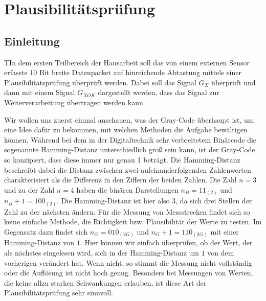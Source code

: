 \documentclass{report}
\begin{document}
\newpage


\tableofcontents

\listoffigures

\newpage
\renewcommand{\thechapter}{A}

\chapter{Plausibilitätsprüfung}
\label{cha:teil-plausibilitat}

\section{Einleitung}
\label{sec:einleitung}

\begin{task}
  TIn dem ersten Teilbereich der Hausarbeit soll das von einem externen Sensor erfasste 10 Bit breite Datenpacket auf hinreichende Abtastung mittels einer Plausibilitätsprüfung überprüft werden. Dabei soll das Signal $G_X$ überprüft und dann mit einem Signal $G_{XOK}$ dargestellt werden, dass das Signal zur Weiterverarbeitung übertragen werden kann.
\end{task}

Wir wollen uns zuerst einmal anschauen, was der Gray-Code überhaupt ist, um eine Idee dafür zu bekommen, mit welchen Methoden die Aufgabe bewältigen können. Während bei dem in der Digitaltechnik sehr verbreitetem Binärcode die sogenannte Hamming-Distanz unterschiedlich groß sein kann, ist der Gray-Code so konzipiert, dass diese immer nur genau 1 beträgt. Die Hamming-Distanz beschreibt dabei die Distanz zwischen zwei aufeinanderfolgenden Zahlenwerten charakterisiert als die Differenz in den Ziffern der beiden Zahlen. Die Zahl $n = 3$ und zu der Zahl $n = 4$ haben die binären Darstellungen $n_{B} = 11_{(2)}$ und $n_{B}+1 = 100_{(2)}$. Die Hamming-Distanz ist hier also $3$, da sich drei Stellen der Zahl zu der nächsten ändern. Für die Messung von Messstrecken findet sich so keine einfache Methode, die Richtigkeit bzw. Plausibilität der Werte zu testen. Im Gegensatz dazu findet sich $n_{G} = 010_{(2G)}$ und $n_{G}+1 = 110_{(2G)}$ mit einer Hamming-Distanz von $1$. Hier können wir einfach überprüfen, ob der Wert, der als nächstes eingelesen wird, sich in der Hamming-Distanz um $1$ von dem vorherigen verändert hat. Wenn nicht, so stimmt die Messung nicht vollständig oder die Auflösung ist nicht hoch genug. Besonders bei Messungen von Werten, die keine allzu starken Schwankungen erlauben, ist diese Art der Plausibilitätsprüfung sehr sinnvoll.
\newpage
\end{document}
